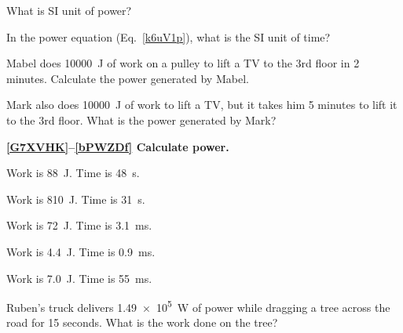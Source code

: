 \documentclass[main.tex]{subfiles}
\begin{document}
\begin{exercise}
    What is SI unit of power?
\end{exercise}

\begin{exercise}
    In the power equation (Eq.~\ref{k6uV1p}), what is the SI unit of time?
\end{exercise}

\begin{exercise} \label{i4fTLq}
    Mabel does \SI{10000}{J} of work on a pulley to lift a TV to the 3rd floor in 2 minutes. Calculate the power generated by Mabel.
\end{exercise}

\begin{exercise} \label{vJllNv}
    Mark also does \SI{10000}{J} of work to lift a TV, but it takes him 5 minutes to lift it to the 3rd floor. What is the power generated by Mark?
\end{exercise}

\cyanhrule

\vspace{1em}

\textbf{\ref{G7XVHK}--\ref{bPWZDf} Calculate power.}

\begin{exercise} \label{G7XVHK}
    Work is \SI{88}{J}. Time is \SI{48}{s}.
\end{exercise}

\begin{exercise} \label{CJRoQV}
    Work is \SI{810}{J}. Time is \SI{31}{s}.
\end{exercise}

\begin{exercise} \label{AORjkH}
    Work is \SI{72}{J}. Time is \SI{3.1}{ms}.
\end{exercise}

\begin{exercise} \label{iKHe2E}
    Work is \SI{4.4}{J}. Time is \SI{0.9}{ms}.
\end{exercise}

\begin{exercise} \label{bPWZDf}
    Work is \SI{7.0}{J}. Time is \SI{55}{ms}.
\end{exercise}

\cyanhrule

\vspace{1em}

\begin{exercise} \label{RvNudw}
    Ruben's truck delivers \SI{1.49e5}{W} of power while dragging a tree across the road for 15 seconds. What is the work done on the tree?
\end{exercise}
\end{document}
